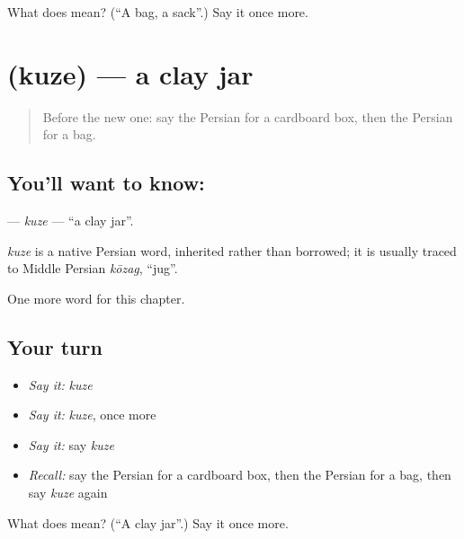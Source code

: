\begin{tcolorbox}[breakable,colback=teal!4,colframe=teal!35!black,title={Before you move on}]
What does  mean? (\textquotedblleft{}A bag, a sack\textquotedblright{}.) Say it once more.
\end{tcolorbox}
\section[\texorpdfstring{\fa{کوزه} (kuze)}{کوزه (kuze)}]{ (kuze) — a clay jar}

\label{lesson:FA-C212-kuze}



\begin{quote}
Before the new one: say the Persian for a cardboard box, then the Persian for a bag.
\end{quote}

\subsection*{You'll want to know: }
\textbf{} — \emph{kuze} — \textquotedblleft{}a clay jar\textquotedblright{}.

\begin{cousinweb}
\emph{kuze} is a native Persian word, inherited rather than borrowed; it is usually traced to Middle Persian \emph{kōzag}, \textquotedblleft{}jug\textquotedblright{}.
\end{cousinweb}

\begin{grammarlens}[title={What you've built}]
One more word for this chapter.
\end{grammarlens}

\subsection*{Your turn}
\begin{itemize}
\raggedright
  \item \emph{Say it:} \emph{kuze}
  \item \emph{Say it:} \emph{kuze}, once more
  \item \emph{Say it:} say \emph{kuze}
  \item \emph{Recall:} say the Persian for a cardboard box, then the Persian for a bag, then say \emph{kuze} again
\end{itemize}

\begin{tcolorbox}[breakable,colback=teal!4,colframe=teal!35!black,title={Before you move on}]
What does  mean? (\textquotedblleft{}A clay jar\textquotedblright{}.) Say it once more.
\end{tcolorbox}
